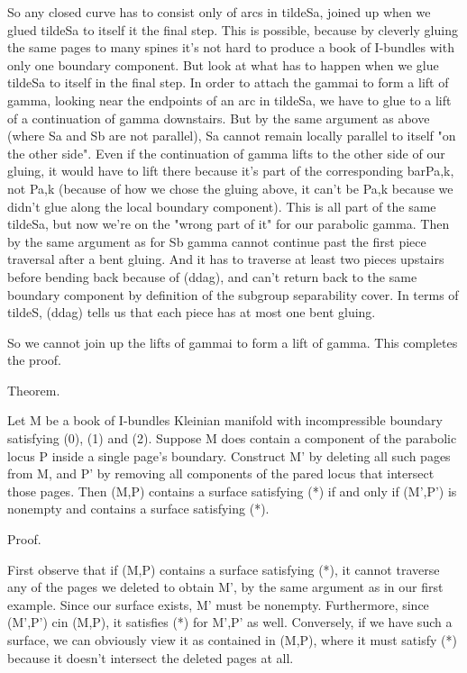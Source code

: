 \documentclass[12pt]{amsart}
\theoremstyle{definition}
\theoremstyle{remark}
\begin{document}
So any closed curve has to consist only of arcs in tildeSa, joined up when we
glued tildeSa to itself it the final step. This is possible, because by
cleverly gluing the same pages to many spines it's not hard to produce a book
of I-bundles with only one boundary component. But look at what has to happen
when we glue tildeSa to itself in the final step. In order to attach the gammai
to form a lift of gamma, looking near the endpoints of an arc in tildeSa, we
have to glue to a lift of a continuation of gamma downstairs. But by the same
argument as above (where Sa and Sb are not parallel), Sa cannot remain locally
parallel to itself "on the other side". Even if the continuation of gamma lifts
to the other side of our gluing, it would have to lift there because it's part
of the corresponding barPa,k, not Pa,k (because of how we chose the gluing
above, it can't be Pa,k because we didn't glue along the local boundary
component). This is all part of the same tildeSa, but now we're on the "wrong
part of it" for our parabolic gamma. Then by the same argument as for Sb gamma
cannot continue past the first piece traversal after a bent gluing. And it has
to traverse at least two pieces upstairs before bending back because of (ddag),
and can't return back to the same boundary component by definition of the
subgroup separability cover. In terms of tildeS, (ddag) tells us that each
piece has at most one bent gluing.

So we cannot join up the lifts of gammai to form a lift of gamma. This
completes the proof.


Theorem.

Let M be a book of I-bundles Kleinian manifold with incompressible boundary
satisfying (0), (1) and (2). Suppose M does contain a component of the
parabolic locus P inside a single page's boundary. Construct M' by deleting all
such pages from M, and P' by removing all components of the pared locus that
intersect those pages. Then (M,P) contains a surface satisfying (*) if and only
if (M',P') is nonempty and contains a surface satisfying (*).

Proof.

First observe that if (M,P) contains a surface satisfying (*), it cannot
traverse any of the pages we deleted to obtain M', by the same argument as in
our first example.  Since our surface exists, M' must be nonempty.
Furthermore, since (M',P') cin (M,P), it satisfies (*) for M',P' as well.
Conversely, if we have such a surface, we can obviously view it as contained in
(M,P), where it must satisfy (*) because it doesn't intersect the deleted pages
at all.
\end{document}
